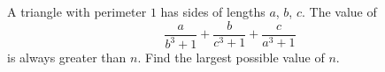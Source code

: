 A triangle with perimeter $1$ has sides of lengths $a$, $b$, $c$. The value of
\[\dfrac{a}{b^3+1}+\dfrac{b}{c^3+1}+\dfrac{c}{a^3+1}\]
is always greater than $n$. Find the largest possible value of $n$.
